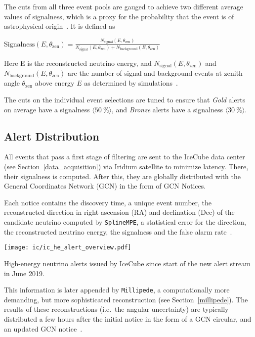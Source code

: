 The cuts from all three event pools are gauged to achieve two different average values of signalness, which is a proxy for the probability that the event is of astrophysical origin~\cite{Abbasi2023}. It is defined as
\begin{definition}\label{signalness_def}
    $\text{Signalness}(E,\theta_\text{zen}) = \frac{N_\text{signal}(E,\theta_\text{zen})}{N_\text{signal}(E,\theta_\text{zen})+N_\text{background}(E,\theta_\text{zen})}$
\end{definition}
Here E is the reconstructed neutrino energy, and $N_\text{signal}(E,\theta_\text{zen})$ and $N_\text{background}(E,\theta_\text{zen})$ are the number of signal and background events at zenith angle $\theta_\text{zen}$ above energy $E$ as determined by simulations~\cite{Abbasi2023}.

The cuts on the individual event selections are tuned to ensure that \textit{Gold} alerts on average have a signalness $\langle \SI{50}{\percent} \rangle$, and \textit{Bronze} alerts have a signalness $\langle \SI{30}{\percent} \rangle$.

\subsection{Alert Distribution} \label{ic_alerts}
All events that pass a first stage of filtering are sent to the IceCube data center (see Section~\ref{data_acquisition}) via Iridium satellite to minimize latency. There, their signalness is computed. After this, they are globally distributed with the General Coordinates Network (GCN) in the form of GCN Notices.

Each notice contains the discovery time, a unique event number, the reconstructed direction in right ascension (RA) and declination (Dec) of the candidate neutrino computed by \texttt{SplineMPE}, a statistical error for the direction, the reconstructed neutrino energy, the signalness and the false alarm rate~\cite{Blaufuss2019}.

\begin{marginfigure}
    \texttt{[image: ic/ic\_he\_alert\_overview.pdf]}
    \caption[IceCube alert overview]{High-energy neutrino alerts issued by IceCube since start of the new alert stream in June 2019.}
\end{marginfigure}

This information is later appended by \texttt{Millipede}, a computationally more demanding, but more sophisticated reconstruction (see Section~\ref{millipede}). The results of these reconstructions (i.e.\ the angular uncertainty) are typically distributed a few hours after the initial notice in the form of a GCN circular, and an updated GCN notice~\cite{Blaufuss2019}.

